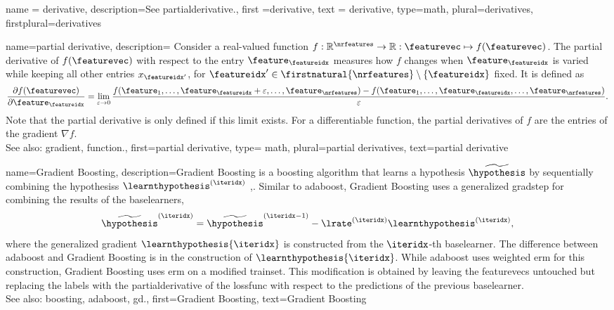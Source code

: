 {name = {derivative}, 
 description={See \gls{partialderivative}.}, 
 first ={derivative}, 
 text = {derivative}, 
 type=math, 
 plural={derivatives}, 
 firstplural={derivatives}
 }


{name={partial derivative},
 description={
		Consider a real-valued \gls{function} 
		$f: \mathbb{R}^{\nrfeatures} \rightarrow \mathbb{R}: \featurevec \mapsto f(\featurevec)$. 
	     The partial derivative of $f(\featurevec)$ 
		 with respect to the entry $\feature_{\featureidx}$ measures how  
		 $f$ changes when $\feature_\featureidx$ is varied while keeping all 
        other entries $x_{\featureidx'}$, for $\featureidx' \in \firstnatural{\nrfeatures} \setminus \{\featureidx \}$ 
		fixed. It is defined as \cite{RudinBookPrinciplesMatheAnalysis}
        $$
            \frac{\partial f(\featurevec)}{\partial \feature_\featureidx}
            = \lim_{\varepsilon \rightarrow 0} 
              \frac{f(\feature_1,\ldots,\feature_{\featureidx}+\varepsilon,\ldots,\feature_\nrfeatures) 
			  - f(\feature_1,\ldots,\feature_\featureidx,\ldots,\feature_\nrfeatures)}{\varepsilon}.$$
		Note that the partial derivative is only defined if this limit exists. 
		For a \gls{differentiable} function, the partial derivatives of $f$ are the entries 
		of the \gls{gradient} $\nabla f$. 
\\
        See also: \gls{gradient}, \gls{function}.},
    first={partial derivative},
	type= math, 
	 plural={partial derivatives},
    text={partial derivative}
}


 {name={Gradient Boosting},
 	description={Gradient Boosting is a \gls{boosting} 
 		\gls{algorithm} that learns a \gls{hypothesis} $\widetilde{\hypothesis}$ 
 		by sequentially combining the \glspl{hypothesis} $\learnthypothesis^{(\iteridx)}$ 
 		\cite{Friedman2001},\cite[Alg. 10.3]{hastie01statisticallearning}. 
 		Similar to \gls{adaboost}, Gradient Boosting uses a generalized \gls{gradstep} 
 		for combining the results of the \glspl{baselearner}, 
        $$\widetilde{\hypothesis}^{(\iteridx)} = \widetilde{\hypothesis}^{(\iteridx-1)}-\lrate^{(\iteridx)} 
 		\learnthypothesis^{(\iteridx)},$$
 		where the generalized gradient $\learnthypothesis{\iteridx}$ is constructed from 
		the $\iteridx$-th \gls{baselearner}.
 		The difference between \gls{adaboost} and Gradient Boosting is in the construction 
		of $\learnthypothesis{\iteridx}$. While \gls{adaboost} uses weighted \gls{erm} for this construction, 
		Gradient Boosting uses \gls{erm} on a modified \gls{trainset}. This modification is obtained 
		by leaving the \glspl{featurevec} untouched but replacing the \glspl{label} with the 
		\gls{partialderivative} of the \gls{lossfunc} with respect to the \glspl{prediction} 
		of the previous \gls{baselearner}.   
 		 \\
 		See also: \gls{boosting}, \gls{adaboost}, \gls{gd}.},
 	first={Gradient Boosting}, 
 	text={Gradient Boosting}
 }


